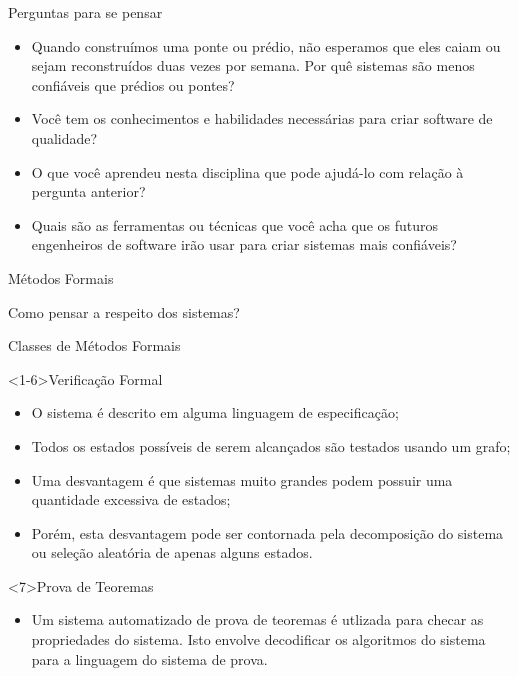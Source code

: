 \begin{frame}{Perguntas para se pensar}

  \begin{itemize}
  \item<1-> Quando construímos uma ponte ou prédio, não esperamos que eles caiam ou sejam
    reconstruídos duas vezes por semana. Por quê sistemas são menos confiáveis que prédios
    ou pontes?
  \item<2-> Você tem os conhecimentos e habilidades necessárias para
    criar software de qualidade?
  \item<3-> O que você aprendeu nesta disciplina que pode ajudá-lo com
    relação à pergunta anterior?
  \item<4-> Quais são as ferramentas ou técnicas que você acha que os futuros
    engenheiros de software irão usar para criar sistemas mais confiáveis?
  \end{itemize}
    
\end{frame}


\begin{frame}{Métodos Formais}

  \alert{Como pensar a respeito dos sistemas?}



  
\end{frame}

\begin{frame}{Classes de Métodos Formais}\footnotesize
  \begin{block}<1-6>{Verificação Formal}
    \begin{itemize}
    \item<2,6> O sistema é descrito em alguma linguagem de especificação;
    \item<3,6> Todos os estados possíveis de serem \alert{alcançados} são testados
      usando um grafo;
    \item<4,6> Uma \alert{desvantagem} é que sistemas muito grandes podem possuir uma
      quantidade excessiva de estados;
    \item<5,6> Porém, esta desvantagem pode ser contornada pela decomposição do sistema
      ou seleção aleatória de apenas alguns estados.
    \end{itemize}
    \end{block}

    \begin{block}<7>{Prova de Teoremas}
      \begin{itemize}
      \item Um sistema automatizado de prova de teoremas é utlizada para
        checar as propriedades do sistema. Isto envolve decodificar os algoritmos
        do sistema para a linguagem do sistema de prova.
      \end{itemize}
  \end{block}
  
\end{frame}


